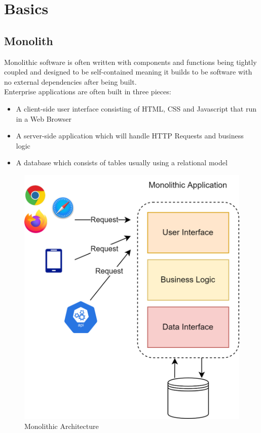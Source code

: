 \documentclass[BIF,Master,nenglish]{twbook}%
\begin{document}
\chapter{Basics}

\section{Monolith}
Monolithic software is often written with components and functions being tightly coupled and designed to be self-contained meaning it builds to be software with no external dependencies after being built.
\\
Enterprise applications are often built in three pieces:
\begin{itemize}
  \item A client-side user interface consisting of HTML, CSS and Javascript that run in a Web Browser
  \item A server-side application which will handle HTTP Requests and business logic
  \item A database which consists of tables usually using a relational model
\end{itemize}

\begin{figure} [H]
 \begin{center}
    \includegraphics[width=0.7\linewidth]{img/Monolith.png}
 \end{center}
 \caption{Monolithic Architecture}
 \label{monolith}
\end{figure}
\end{document}
